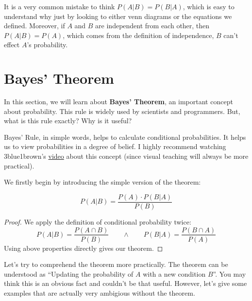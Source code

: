 It is a very common mistake to think $P( A | B) = P(B | A)$, which is easy to understand why just by looking to either venn diagrams or the
equations we defined. Moreover, if $A$ and $B$ are independent from each other, then $P(A|B)= P(A)$, which comes from the definition of
independence, $B$ can't effect $A$'s probability.

\section{Bayes' Theorem}

In this section, we will learn about \textbf{Bayes' Theorem}, an important concept about probability. This rule is widely used by
scientists and programmers. But, what is this rule exactly? Why is it useful?

Bayes' Rule, in simple words, helps to calculate conditional probabilities. It helps us to view probabilities in a degree of belief. I
highly recommend watching 3blue1brown's \href{https://www.youtube.com/watch?v=HZGCoVF3YvM&feature=emb_title}{video} about this concept
(since visual teaching will always be more practical).

\par

We firstly begin by introducing the simple version of the theorem:
\begin{theorem}
    $$ P(A|B) = \frac{P(A) \cdot P(B|A)}{P(B)} $$
\end{theorem}

\begin{proof}
    We apply the definition of conditional probability twice:
    $$ P(A|B) = \frac{P(A \cap B)}{P(B)} \qquad \land \qquad  P(B|A) = \frac{P(B \cap A)}{P(A)}$$
    Using above properties directly gives our theorem.
\end{proof}

\par
Let's try to comprehend the theorem more practically. The theorem can be understood as ``Updating the probability of $A$ with a new
condition $B$''. You may think this is an obvious fact and couldn't be that useful. However, let's give some examples that are actually
very ambigious without the theorem.

